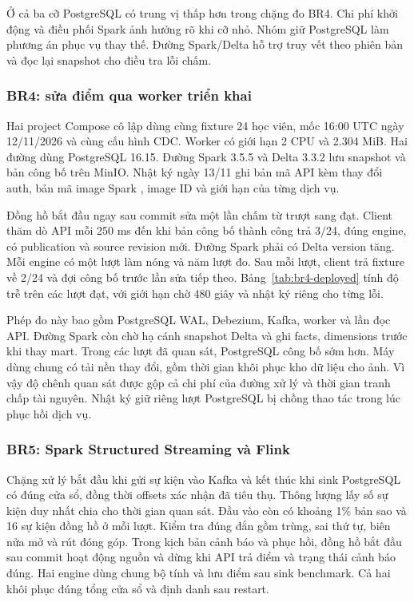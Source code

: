 


Ở cả ba cỡ PostgreSQL có trung vị thấp hơn trong chặng đo BR4. Chi phí khởi động và điều phối Spark ảnh hưởng rõ khi cỡ nhỏ. Nhóm giữ PostgreSQL làm phương án phục vụ thay thế. Đường Spark/Delta hỗ trợ truy vết theo phiên bản và đọc lại snapshot cho điều tra lỗi chấm.

\subsubsection{BR4: sửa điểm qua worker triển khai}

Hai project Compose cô lập dùng cùng fixture 24 học viên, mốc 16:00 UTC ngày 12/11/2026 và cùng cấu hình CDC. Worker có giới hạn 2 CPU và 2.304 MiB. Hai đường dùng PostgreSQL 16.15. Đường Spark 3.5.5 và Delta 3.3.2 lưu snapshot và bản công bố trên MinIO. Nhật ký ngày 13/11 ghi bản mã API  kèm thay đổi auth, bản mã image Spark , image ID và giới hạn của từng dịch vụ.

Đồng hồ bắt đầu ngay sau commit sửa một lần chấm từ trượt sang đạt. Client thăm dò API mỗi 250 ms đến khi bản công bố thành công trả 3/24, đúng engine, có publication và source revision mới. Đường Spark phải có Delta version tăng. Mỗi engine có một lượt làm nóng và năm lượt đo. Sau mỗi lượt, client trả fixture về 2/24 và đợi công bố trước lần sửa tiếp theo. Bảng~\ref{tab:br4-deployed} tính độ trễ trên các lượt đạt, với giới hạn chờ 480 giây và nhật ký riêng cho từng lỗi.



Phép đo này bao gồm PostgreSQL WAL, Debezium, Kafka, worker và lần đọc API. Đường Spark còn chờ hạ cánh snapshot Delta và ghi facts, dimensions trước khi thay mart. Trong các lượt đã quan sát, PostgreSQL công bố sớm hơn. Máy dùng chung có tải nền thay đổi, gồm thời gian khôi phục kho dữ liệu cho ảnh. Vì vậy độ chênh quan sát được gộp cả chi phí của đường xử lý và thời gian tranh chấp tài nguyên. Nhật ký giữ riêng lượt PostgreSQL bị chồng thao tác trong lúc phục hồi dịch vụ.

\subsubsection{BR5: Spark Structured Streaming và Flink}

Chặng xử lý bắt đầu khi gửi sự kiện vào Kafka và kết thúc khi sink PostgreSQL có đúng cửa sổ, đồng thời offsets xác nhận đã tiêu thụ. Thông lượng lấy số sự kiện duy nhất chia cho thời gian quan sát. Đầu vào còn có khoảng 1\% bản sao và 16 sự kiện đồng hồ ở mỗi lượt. Kiểm tra đúng đắn gồm trùng, sai thứ tự, biên nửa mở và rút đóng góp. Trong kịch bản cảnh báo và phục hồi, đồng hồ bắt đầu sau commit hoạt động nguồn và dừng khi API trả điểm và trạng thái cảnh báo đúng. Hai engine dùng chung bộ tính và lưu điểm sau sink benchmark. Cả hai khôi phục đúng tổng cửa sổ và định danh sau restart.

